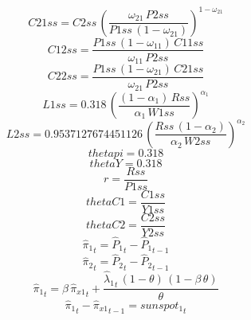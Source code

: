 \begin{dmath*}
C21ss = {C2ss}\, \left(\frac{{{\omega_{21}}}\, {P2ss}}{{P1ss}\, \left(1-{{\omega_{21}}}\right)}\right)^{1-{{\omega_{21}}}}
\end{dmath*}
\begin{dmath*}
C12ss = \frac{{P1ss}\, \left(1-{{\omega_{11}}}\right)\, {C11ss}}{{{\omega_{11}}}\, {P2ss}}
\end{dmath*}
\begin{dmath*}
C22ss = \frac{{P1ss}\, \left(1-{{\omega_{21}}}\right)\, {C21ss}}{{{\omega_{21}}}\, {P2ss}}
\end{dmath*}
\begin{dmath*}
L1ss = 0.318\, \left(\frac{\left(1-{{\alpha_{1}}}\right)\, {Rss}}{{{\alpha_{1}}}\, {W1ss}}\right)^{{{\alpha_{1}}}}
\end{dmath*}
\begin{dmath*}
L2ss = 0.9537127674451126\, \left(\frac{{Rss}\, \left(1-{{\alpha_{2}}}\right)}{{{\alpha_{2}}}\, {W2ss}}\right)^{{{\alpha_{2}}}}
\end{dmath*}
\begin{dmath*}
thetapi = 0.318
\end{dmath*}
\begin{dmath*}
thetaY = 0.318
\end{dmath*}
\begin{dmath*}
r = \frac{{Rss}}{{P1ss}}
\end{dmath*}
\begin{dmath*}
thetaC1 = \frac{{C1ss}}{{Y1ss}}
\end{dmath*}
\begin{dmath*}
thetaC2 = \frac{{C2ss}}{{Y2ss}}
\end{dmath*}
\begin{dmath}
{{\hat{\pi}_{1}}}_{t}={{\hat{P}_{1}}}_{t}-{{\hat{P}_{1}}}_{t-1}
\end{dmath}
\begin{dmath}
{{\hat{\pi}_{2}}}_{t}={{\hat{P}_{2}}}_{t}-{{\hat{P}_{2}}}_{t-1}
\end{dmath}
\begin{dmath}
{{\hat{\pi}_{1}}}_{t}={{\beta}}\, {{\hat{\pi}_{x1}}}_{t}+\frac{{{\hat{\lambda}_{1}}}_{t}\, \left(1-{{\theta}}\right)\, \left(1-{{\beta}}\, {{\theta}}\right)}{{{\theta}}}
\end{dmath}
\begin{dmath}
{{\hat{\pi}_{1}}}_{t}-{{\hat{\pi}_{x1}}}_{t-1}={{sunspot_{1}}}_{t}
\end{dmath}
